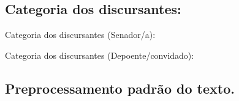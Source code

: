 \documentclass[
]{article}
\newenvironment{Shaded}{\begin{snugshade}}{\end{snugshade}}
\newcommand{\KeywordTok}[1]{\textcolor[rgb]{0.13,0.29,0.53}{\textbf{#1}}}
\newcommand{\NormalTok}[1]{#1}
\newcommand{\OperatorTok}[1]{\textcolor[rgb]{0.81,0.36,0.00}{\textbf{#1}}}
\newcommand{\StringTok}[1]{\textcolor[rgb]{0.31,0.60,0.02}{#1}}
\begin{document}
\hypertarget{categoria-dos-discursantes}{%
\subsection{Categoria dos
discursantes:}\label{categoria-dos-discursantes}}

Categoria dos discursantes (Senador/a):

\begin{Shaded}
\end{Shaded}

Categoria dos discursantes (Depoente/convidado):

\begin{Shaded}
\end{Shaded}

\hypertarget{preprocessamento-padruxe3o-do-texto.}{%
\subsection{Preprocessamento padrão do
texto.}\label{preprocessamento-padruxe3o-do-texto.}}
\end{document}
